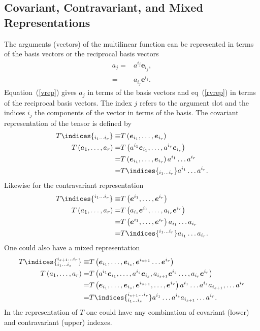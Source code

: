\documentclass[12pt]{report}
\newcommand{\bm}[1]{\boldsymbol{#1}}
\newcommand{\lp}{\left (}
\newcommand{\rp}{\right )}
\newcommand{\f}[2]{{#1}\lp {#2} \rp}
\newcommand{\eb}{\bm{e}}
\begin{document}
\subsection{Covariant, Contravariant, and Mixed Representations}

The arguments (vectors) of the multilinear function can be represented in terms of the basis vectors or the reciprocal basis vectors
\begin{align}
    a_{j} =& a^{i_{j}}\eb_{i_{j}}, \label{vrep}\\
          =& a_{i_{j}}\eb^{i_{j}}. \label{rvrep}
\end{align}
Equation~(\ref{vrep}) gives $a_{j}$ in terms of the basis vectors and eq~(\ref{rvrep}) in terms of the reciprocal basis vectors. The index
$j$ refers to the argument slot and the indices $i_{j}$ the components of the vector in terms of the basis.  The 
covariant representation of the tensor is defined by
\begin{align}
    T\indices{_{i_{1}\dots i_{r}}} \equiv& \f{T}{\eb_{i_{1}},\dots,\eb_{i_{r}}} \\
    \f{T}{a_{1},\dots,a_{r}} =& \f{T}{a^{i_{1}}\eb_{i_{1}},\dots,a^{i_{r}}\eb_{i_{r}}} \nonumber \\
                             =& \f{T}{\eb_{i_{1}},\dots,\eb_{i_{r}}}a^{i_{1}}\dots a^{i_{r}} \nonumber \\
                             =& T\indices{_{i_{1}\dots i_{r}}}a^{i_{1}}\dots a^{i_{r}}.
\end{align}
Likewise for the contravariant representation
\begin{align}
    T\indices{^{i_{1}\dots i_{r}}} \equiv& \f{T}{\eb^{i_{1}},\dots,\eb^{i_{r}}} \\
    \f{T}{a_{1},\dots,a_{r}} =& \f{T}{a_{i_{1}}\eb^{i_{1}},\dots,a_{i_{r}}\eb^{i_{r}}} \nonumber \\
                             =& \f{T}{\eb^{i_{1}},\dots,\eb^{i_{r}}}a_{i_{1}}\dots a_{i_{r}} \nonumber \\
                             =& T\indices{^{i_{1}\dots i_{r}}}a_{i_{1}}\dots a_{i_{r}}.
\end{align}
One could also have a mixed representation
\begin{align}
    T\indices{_{i_{1}\dots i_{s}}^{i_{s+1}\dots i_{r}}} \equiv& \f{T}{\eb_{i_{1}},\dots,\eb_{i_{s}},\eb^{i_{s+1}}\dots\eb^{i_{r}}} \\
    \f{T}{a_{1},\dots,a_{r}} =& \f{T}{a^{i_{1}}\eb_{i_{1}},\dots,a^{i_{s}}\eb_{i_{s}},
                                a_{i_{s+1}}\eb^{i_{s}}\dots,a_{i_{r}}\eb^{i_{r}}} \nonumber \\
                             =& \f{T}{\eb_{i_{1}},\dots,\eb_{i_{s}},\eb^{i_{s+1}},\dots,\eb^{i_{r}}}
                                a^{i_{1}}\dots a^{i_{s}}a_{i_{s+1}},\dots a^{i_{r}} \nonumber \\
                             =& T\indices{_{i_{1}\dots i_{s}}^{i_{s+1}\dots i_{r}}}a^{i_{1}}\dots a^{i_{s}}a_{i_{s+1}}\dots a^{i_{r}}.
\end{align}
In the representation of $T$ one could have any combination of covariant (lower) and contravariant (upper) indexes.
\end{document}
